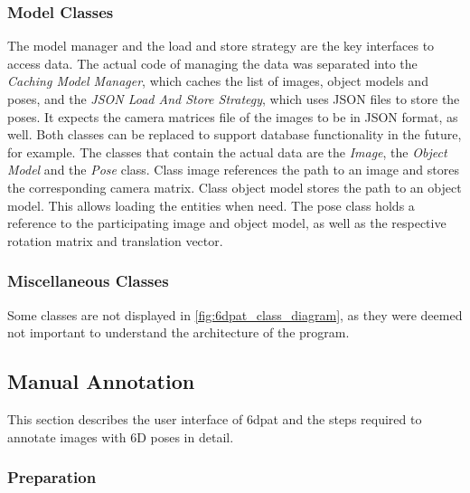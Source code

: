 \subsubsection{Model Classes}

The model manager and the load and store strategy are the key interfaces to access data. The actual code of managing the data was separated into the \textit{Caching Model Manager}, which caches the list of images, object models and poses, and the \textit{JSON Load And Store Strategy}, which uses JSON files to store the poses. It expects the camera matrices file of the images to be in JSON format, as well. Both classes can be replaced to support database functionality in the future, for example. The classes that contain the actual data are the \textit{Image}, the \textit{Object Model} and the \textit{Pose} class. Class image references the path to an image and stores the corresponding camera matrix. Class object model stores the path to an object model. This allows loading the entities when need. The pose class holds a reference to the participating image and object model, as well as the respective rotation matrix and translation vector. 

\subsubsection{Miscellaneous Classes}

Some classes are not displayed in \fig \ref{fig:6dpat_class_diagram}, as they were deemed not important to understand the architecture of the program.

\subsection{Manual Annotation} 

This section describes the user interface of \ac{6dpat} and the steps required to annotate images with 6D poses in detail. 

\subsubsection{Preparation}

